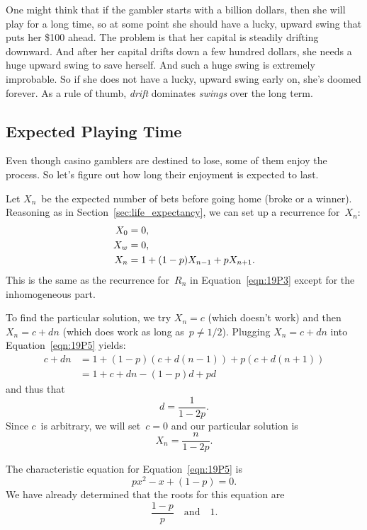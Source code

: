 One might think that if the gambler starts with a billion dollars,
then she will play for a long time, so at some point she should have a
lucky, upward swing that puts her \$100 ahead.  The problem is that
her capital is steadily drifting downward.  And after her capital
drifts down a few hundred dollars, she needs a huge upward swing to
save herself.  And such a huge swing is extremely improbable.  So if
she does not have a lucky, upward swing early on, she's doomed
forever.  As a rule of thumb, \emph{drift} dominates \emph{swings}
over the long term.

\subsection{Expected Playing Time}

Even though casino gamblers are destined to lose, some of them enjoy
the process.  So let's figure out how long their enjoyment is expected
to last.

Let $X_n$~be the expected number of bets before going home (broke or a
winner).  Reasoning as in Section~\ref{sec:life_expectancy}, we can
set up a recurrence for~$X_n$:
\begin{align}
    X_0 &= 0, \notag\\
    X_w &= 0, \notag\\
    X_n &= 1 + (1 - p) X_{n - 1} + p X_{n + 1}. \label{eqn:19P5}
\end{align}
This is the same as the recurrence for~$R_n$ in
Equation~\ref{eqn:19P3} except for the inhomogeneous part.

To find the particular solution, we try $X_n = c$ (which doesn't work)
and then $X_n = c + d n$ (which does work as long as~$p \ne 1/2$).
Plugging $X_n = c + d n$ into Equation~\ref{eqn:19P5} yields:
\begin{align*}
c + d n
    &= 1 + (1 - p) (c + d (n - 1)) + p (c + d (n + 1)) \\
    &= 1 + c + d n - (1 - p) d + p d
\end{align*}
and thus that
\begin{equation*}
    d = \frac{1}{1 - 2p}.
\end{equation*}
Since $c$~is arbitrary, we will set~$c = 0$ and our particular
solution is
\begin{equation*}
    X_n = \frac{n}{1 - 2p}.
\end{equation*}

The characteristic equation for Equation~\ref{eqn:19P5} is
\begin{equation*}
    p x^2 - x + (1 - p) = 0.
\end{equation*}
We have already determined that the roots for this equation are
\begin{equation*}
    \frac{1 - p}{p} \quad \text{and} \quad 1.
\end{equation*}

